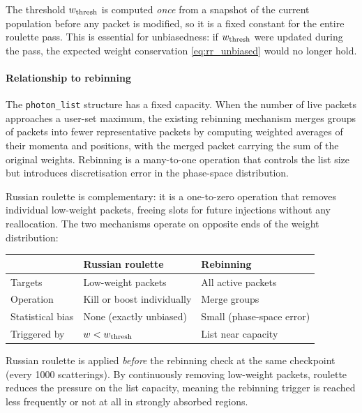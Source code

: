 \documentclass[12pt,a4paper]{article}
\newcommand{\code}[1]{\texttt{#1}}
\begin{document}
The threshold $w_{\rm thresh}$ is computed \emph{once} from a snapshot
of the current population before any packet is modified, so it is a
fixed constant for the entire roulette pass.  This is essential for
unbiasedness: if $w_{\rm thresh}$ were updated during the pass, the
expected weight conservation \eqref{eq:rr_unbiased} would no longer hold.

\paragraph{Relationship to rebinning}
\label{sec:rebin}

The \code{photon\_list} structure has a fixed capacity.  When the
number of live packets approaches a user-set maximum, the existing
rebinning mechanism merges groups of packets into fewer representative
packets by computing weighted averages of their momenta and positions,
with the merged packet carrying the sum of the original weights.
Rebinning is a many-to-one operation that controls the list size but
introduces discretisation error in the phase-space distribution.

Russian roulette is complementary: it is a one-to-zero operation that
removes individual low-weight packets, freeing slots for future
injections without any reallocation.  The two mechanisms operate on
opposite ends of the weight distribution:

\begin{center}
	\renewcommand{\arraystretch}{1.3}
	\begin{tabular}{lll}
		\toprule
		& \textbf{Russian roulette} & \textbf{Rebinning} \\
		\midrule
		Targets      & Low-weight packets           & All active packets \\
		Operation    & Kill or boost individually   & Merge groups \\
		Statistical bias & None (exactly unbiased)  & Small (phase-space error) \\
		Triggered by & $w < w_{\rm thresh}$        & List near capacity \\
		\bottomrule
	\end{tabular}
\end{center}

\vspace{0.5em}
Russian roulette is applied \emph{before} the rebinning check at the
same checkpoint (every 1000 scatterings).  By continuously removing
low-weight packets, roulette reduces the pressure on the list capacity,
meaning the rebinning trigger is reached less frequently or not at all in
strongly absorbed regions.
\end{document}
